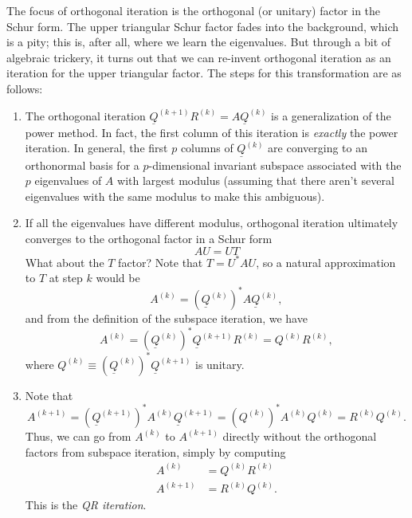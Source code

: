 \documentclass[12pt, leqno]{article} %
\newcommand{\uQ}{\underline{Q}}
\begin{document}
The focus of orthogonal iteration is the orthogonal (or unitary)
factor in the Schur form.  The upper triangular Schur factor
fades into the background, which is a pity; this is, after all, where we
learn the eigenvalues.  But through a bit of algebraic trickery, it turns
out that we can re-invent orthogonal iteration as an iteration for
the upper triangular factor.  The steps for this transformation are as
follows:
\begin{enumerate}
\item
  The orthogonal iteration $\uQ^{(k+1)} R^{(k)} = A \uQ^{(k)}$ is a
  generalization of the power method.  In fact, the first column of
  this iteration is {\em exactly} the power iteration.  In general,
  the first $p$ columns of $\uQ^{(k)}$ are converging to an orthonormal
  basis for a $p$-dimensional invariant subspace associated with the
  $p$ eigenvalues of $A$ with largest modulus (assuming that there
  aren't several eigenvalues with the same modulus to make this
  ambiguous).
\item
  If all the eigenvalues have different modulus, orthogonal iteration
  ultimately converges to the orthogonal factor in a Schur form
  \[
    AU = UT
  \]
  What about the $T$ factor?  Note that $T = U^* A U$, so a natural
  approximation to $T$ at step $k$ would be
  \[
    A^{(k)} = (\uQ^{(k)})^* A \uQ^{(k)},
  \]
  and from the definition of the subspace iteration, we have
  \[
    A^{(k)} = (\uQ^{(k)})^* \uQ^{(k+1)} R^{(k)} = Q^{(k)} R^{(k)},
  \]
  where $Q^{(k)} \equiv (\uQ^{(k)})^* \uQ^{(k+1)}$ is unitary.
\item
  Note that
  \[
    A^{(k+1)}
    = (\uQ^{(k+1)})^* A^{(k)} \uQ^{(k+1)}
    = (Q^{(k)})^* A^{(k)} Q^{(k)}
    = R^{(k)} Q^{(k)}.
  \]
  Thus, we can go from $A^{(k)}$ to $A^{(k+1)}$ directly without
  the orthogonal factors from subspace iteration, simply by computing
  \begin{align*}
    A^{(k)} &= Q^{(k)} R^{(k)} \\
    A^{(k+1)} &= R^{(k)} Q^{(k)}.
  \end{align*}
  This is the {\em QR iteration}.
\end{enumerate}
\end{document}
